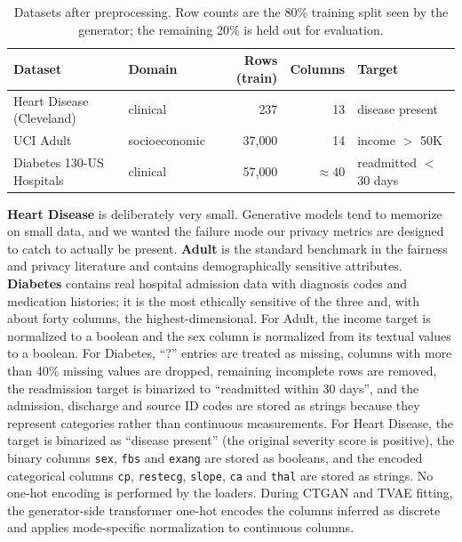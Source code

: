 \documentclass[11pt,a4paper]{article}
\begin{document}
\begin{table}[htbp]
\caption{Datasets after preprocessing. Row counts are the 80\% training split
seen by the generator; the remaining 20\% is held out for evaluation.}
\label{tab:datasets}
\centering\small
\begin{tabular}{@{}llrrl@{}}
\toprule
Dataset & Domain & Rows (train) & Columns & Target \\
\midrule
Heart Disease (Cleveland) \citep{detrano1989heart} & clinical & 237 & 13 & disease present \\
UCI Adult \citep{becker1996adult} & socioeconomic & 37{,}000 & 14 & income $>$ 50K \\
Diabetes 130-US Hospitals \citep{strack2014diabetes} & clinical & 57{,}000 & $\approx 40$ & readmitted $<$ 30 days \\
\bottomrule
\end{tabular}
\end{table}

\textbf{Heart Disease} is deliberately very small. Generative models tend to
memorize on small data, and we wanted the failure mode our privacy metrics are
designed to catch to actually be present. \textbf{Adult} is the standard
benchmark in the fairness and privacy literature and contains demographically
sensitive attributes. \textbf{Diabetes} contains real hospital admission data
with diagnosis codes and medication histories; it is the most ethically
sensitive of the three and, with about forty columns, the highest-dimensional.
For Adult, the income target is normalized to a boolean and the sex column is
normalized from its textual values to a boolean. For Diabetes, ``?'' entries
are treated as missing, columns with more than 40\% missing values are dropped,
remaining incomplete rows are removed, the readmission target is binarized to
``readmitted within 30 days'', and the admission, discharge and source ID
codes are stored as strings because they represent categories rather than
continuous measurements. For Heart Disease, the target is binarized as
``disease present'' (the original severity score is positive), the binary
columns \texttt{sex}, \texttt{fbs} and \texttt{exang} are stored as booleans,
and the encoded categorical columns \texttt{cp}, \texttt{restecg},
\texttt{slope}, \texttt{ca} and \texttt{thal} are stored as strings. No
one-hot encoding is performed by the loaders. During CTGAN and TVAE fitting,
the generator-side transformer one-hot encodes the columns inferred as
discrete and applies mode-specific normalization to continuous columns.
\end{document}
